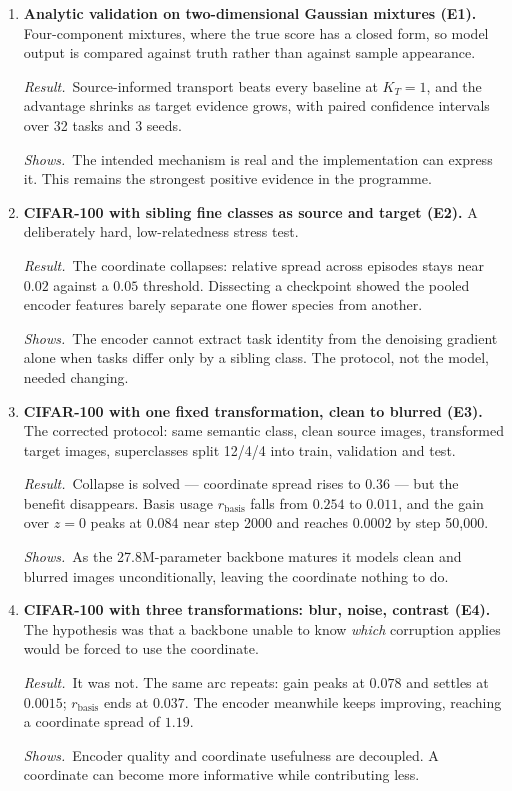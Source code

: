 \documentclass[11pt]{article}
\newcommand{\res}{\par\smallskip\textit{Result.}\ }
\newcommand{\shows}{\par\smallskip\textit{Shows.}\ }
\newcommand{\KT}{K_{T}}
\begin{document}
\begin{enumerate}

\item \textbf{Analytic validation on two-dimensional Gaussian mixtures (E1).}
Four-component mixtures, where the true score has a closed form, so model output is
compared against truth rather than against sample appearance.
\res Source-informed transport beats every baseline at $\KT = 1$, and the advantage
shrinks as target evidence grows, with paired confidence intervals over 32 tasks and 3
seeds.
\shows The intended mechanism is real and the implementation can express it. This remains
the strongest positive evidence in the programme.

\item \textbf{CIFAR-100 with sibling fine classes as source and target (E2).}
A deliberately hard, low-relatedness stress test.
\res The coordinate collapses: relative spread across episodes stays near $0.02$ against a
$0.05$ threshold. Dissecting a checkpoint showed the pooled encoder features barely
separate one flower species from another.
\shows The encoder cannot extract task identity from the denoising gradient alone when
tasks differ only by a sibling class. The protocol, not the model, needed changing.

\item \textbf{CIFAR-100 with one fixed transformation, clean to blurred (E3).}
The corrected protocol: same semantic class, clean source images, transformed target
images, superclasses split 12/4/4 into train, validation and test.
\res Collapse is solved --- coordinate spread rises to $0.36$ --- but the benefit
disappears. Basis usage $r_{\mathrm{basis}}$ falls from $0.254$ to $0.011$, and the gain
over $z = 0$ peaks at $0.084$ near step 2000 and reaches $0.0002$ by step 50{,}000.
\shows As the 27.8M-parameter backbone matures it models clean and blurred images
unconditionally, leaving the coordinate nothing to do.

\item \textbf{CIFAR-100 with three transformations: blur, noise, contrast (E4).}
The hypothesis was that a backbone unable to know \emph{which} corruption applies would be
forced to use the coordinate.
\res It was not. The same arc repeats: gain peaks at $0.078$ and settles at $0.0015$;
$r_{\mathrm{basis}}$ ends at $0.037$. The encoder meanwhile keeps improving, reaching a
coordinate spread of $1.19$.
\shows Encoder quality and coordinate usefulness are decoupled. A coordinate can become
more informative while contributing less.


\end{enumerate}
\end{document}
